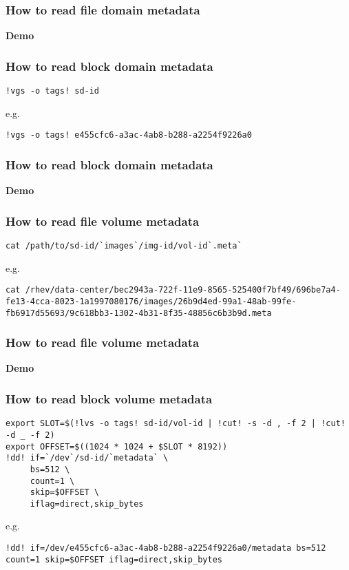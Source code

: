 \documentclass[10pt,utf8]{beamer}
\begin{document}
\begin{frame}
	\frametitle{How to read file domain metadata}
	\centering
	\huge{\textbf{Demo}}
\end{frame}

\begin{frame}[fragile]
	\frametitle{How to read block domain metadata}
	\begin{lstlisting}[style=Bash]
!vgs -o tags! sd-id
	\end{lstlisting}

	\vspace{0.5cm}
	e.g.
	\vspace{0.5cm}

	\begin{lstlisting}[style=Bash]
!vgs -o tags! e455cfc6-a3ac-4ab8-b288-a2254f9226a0
	\end{lstlisting}
\end{frame}

\begin{frame}
  \frametitle{How to read block domain metadata}
	\centering
	\huge{\textbf{Demo}}
\end{frame}

\begin{frame}[fragile]
	\frametitle{How to read file volume metadata}
	\begin{lstlisting}[style=Bash]
cat /path/to/sd-id/`images`/img-id/vol-id`.meta`
	\end{lstlisting}

	\vspace{0.5cm}
	e.g.
	\vspace{0.5cm}

\begin{lstlisting}[style=Bash]
cat /rhev/data-center/bec2943a-722f-11e9-8565-525400f7bf49/696be7a4-fe13-4cca-8023-1a1997080176/images/26b9d4ed-99a1-48ab-99fe-fb6917d55693/9c618bb3-1302-4b31-8f35-48856c6b3b9d.meta 
	\end{lstlisting}
\end{frame}

\begin{frame}
  \frametitle{How to read file volume metadata}
	\centering
	\huge{\textbf{Demo}}
\end{frame}

\begin{frame}[fragile]
	\frametitle{How to read block volume metadata}
	\begin{lstlisting}[style=Bash]
export SLOT=$(!lvs -o tags! sd-id/vol-id | !cut! -s -d , -f 2 | !cut! -d _ -f 2)
export OFFSET=$((1024 * 1024 + $SLOT * 8192))
!dd! if=`/dev`/sd-id/`metadata` \
	 bs=512 \
	 count=1 \
	 skip=$OFFSET \
	 iflag=direct,skip_bytes
	\end{lstlisting}

	\vspace{0.5cm}
	e.g.
	\vspace{0.5cm}


	\begin{lstlisting}[style=Bash]
!dd! if=/dev/e455cfc6-a3ac-4ab8-b288-a2254f9226a0/metadata bs=512 count=1 skip=$OFFSET iflag=direct,skip_bytes
	\end{lstlisting}
\end{frame}
\end{document}
